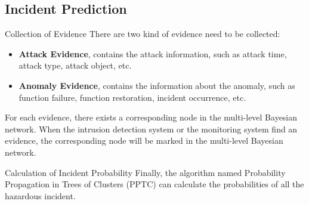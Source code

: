\subsection{Incident Prediction}
\begin{frame}{Collection of Evidence}
    There are two kind of evidence need to be collected:
    \begin{itemize}
      \item \textbf{Attack Evidence}, contains the attack information, such as attack time, attack type, attack object, etc.
      \item \textbf{Anomaly Evidence}, contains the information about the anomaly, such as function failure, function restoration, incident occurrence, etc.
    \end{itemize}
    \pause
    
    For each evidence, there exists a corresponding node in the multi-level Bayesian network. When the intrusion detection system or the monitoring system find an evidence, the corresponding node will be marked in the multi-level Bayesian network.
\end{frame}

\begin{frame}{Calculation of Incident Probability}
    Finally, the algorithm named Probability Propagation in Trees of Clusters (PPTC) can calculate the probabilities of all the hazardous incident.
\end{frame} 
